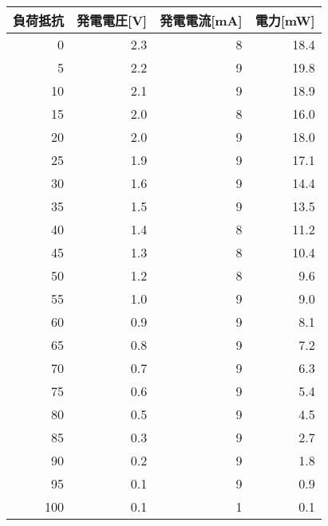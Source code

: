\begin{tabular}{@{}rrrr@{}}
  \toprule
  \multicolumn{1}{c}{負荷抵抗} & \multicolumn{1}{c}{発電電圧{[}V{]}} & \multicolumn{1}{c}{発電電流{[}mA{]}} & \multicolumn{1}{c}{電力{[}mW{]}} \\ \midrule
  0  & 2.3 & 8  & 18.4\\
  5  & 2.2 & 9  & 19.8\\
  10 & 2.1 & 9  & 18.9\\
  15 & 2.0 & 8  & 16.0\\
  20 & 2.0 & 9  & 18.0\\
  25 & 1.9 & 9  & 17.1\\
  30 & 1.6 & 9  & 14.4\\
  35 & 1.5 & 9  & 13.5\\
  40 & 1.4 & 8  & 11.2\\
  45 & 1.3 & 8  & 10.4\\
  50 & 1.2 & 8  & 9.6 \\
  55 & 1.0 & 9  & 9.0 \\
  60 & 0.9 & 9  & 8.1 \\
  65 & 0.8 & 9  & 7.2 \\
  70 & 0.7 & 9  & 6.3 \\
  75 & 0.6 & 9  & 5.4 \\
  80 & 0.5 & 9  & 4.5 \\
  85 & 0.3 & 9  & 2.7 \\
  90 & 0.2 & 9  & 1.8 \\
  95 & 0.1 & 9  & 0.9 \\
  100 & 0.1 & 1 & 0.1 \\ \bottomrule
\end{tabular}